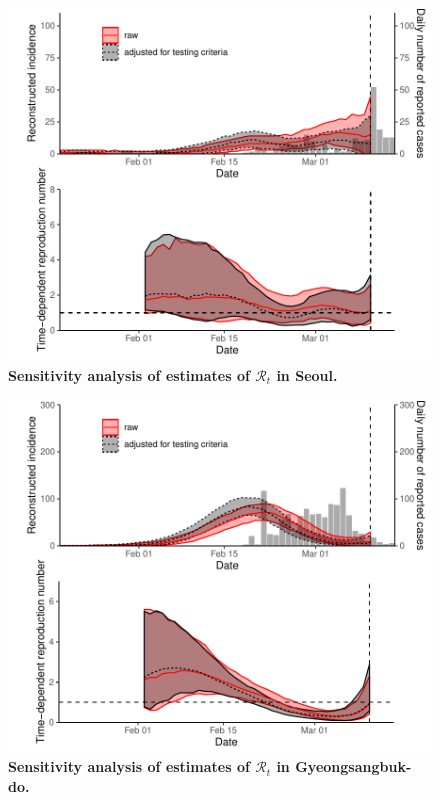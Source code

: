 \pagebreak

\begin{figure}[!ht]
\includegraphics[width=\textwidth]{figure_R_t_seoul.pdf}
\caption{
\textbf{Sensitivity analysis of estimates of $\mathcal R_t$ in Seoul.}
}
\end{figure}

\pagebreak

\begin{figure}[!ht]
\includegraphics[width=\textwidth]{figure_R_t_gyeongbuk.pdf}
\caption{
\textbf{Sensitivity analysis of estimates of $\mathcal R_t$ in Gyeongsangbuk-do.}
}
\end{figure}

